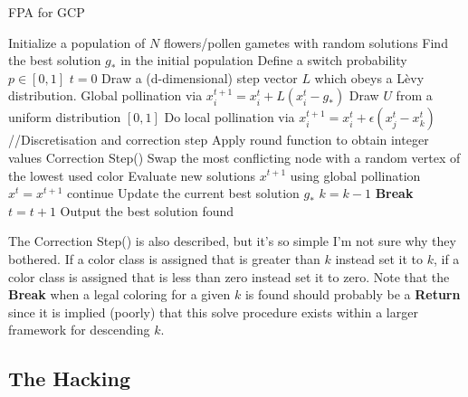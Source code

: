 \begin{algorithm}[H]
    \caption{FPA for GCP}
    \label{FPA1}
    \begin{algorithmic}[1] %
         			
			\State Initialize a population of $N$ flowers/pollen gametes with random solutions
			\State Find the best solution $g_*$ in the initial population
			\State Define a switch probability $p \in [0,1]$
			\State $t=0$
					 
						\State Draw a (d-dimensional) step vector $L$ which obeys a L\`evy distribution.
						\State Global pollination via $x_i^{t+1} = x_i^{t} + L(x_i^{t} - g_*)$
					\Else
						\State Draw $U$ from a uniform distribution $[0,1]$
						\State Do local pollination via $x_i^{t+1} = x_i^{t} + \epsilon(x_j^{t} - x_k^{t})$
					\EndIf
					\State //Discretisation and correction step
					\State Apply round function to obtain integer values
					\State Correction Step() 
						\State Swap the most conflicting node with a random vertex of the lowest used color
						\State Evaluate new solutions $x^{t+1}$ using global pollination
							\State $x^t = x^{t+1}$
						\EndIf
					\Else continue
					\EndIf
				\EndFor
				\State Update the current best solution $g_*$
						\State $k = k-1$
						\State \textbf{Break}
					\EndIf
			\State $t = t+1$
			\EndWhile
			\State Output the best solution found
		\EndProcedure
    \end{algorithmic}
\end{algorithm}


The Correction Step() is also described, but it's so simple I'm not sure why they bothered. If a color class is assigned that is greater than $k$ instead set it to $k$, if a color class is assigned that is less than zero instead set it to zero.
Note that the \textbf{Break} when a legal coloring for a given $k$  is found should probably be a \textbf{Return} since it is implied (poorly) that this solve procedure exists within a larger framework for descending $k$.


\subsection{The Hacking}


